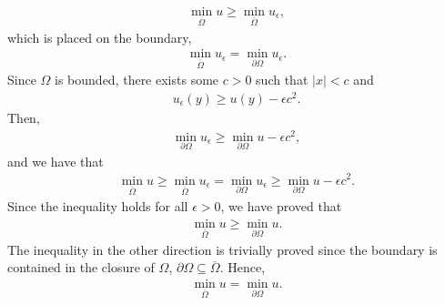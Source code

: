 \begin{questions}
\begin{solution}
\begin{align*}
\min_{\overline{\Omega}}u\geq\min_{\overline{\Omega}}u_{\epsilon},
\end{align*}
which is placed on the boundary,
\begin{align*}
\min_{\overline{\Omega}}u_{\epsilon}=\min_{\partial\Omega}u_{\epsilon}.
\end{align*}
Since $\Omega$ is bounded, there exists some $c>0$ such that $|x|<c$ and
\begin{align*}
u_{\epsilon}(y)\geq u(y)-\epsilon c^2.
\end{align*}
Then,
\begin{align*}
\min_{\partial\Omega}u_{\epsilon}\geq \min_{\partial\Omega}u-\epsilon c^2, 
\end{align*}
and we have that
\begin{align*}
\min_{\overline{\Omega}}u\geq \min_{\overline{\Omega}}u_{\epsilon}=\min_{\partial\Omega}u_{\epsilon}\geq \min_{\partial\Omega}u-\epsilon c^2.
\end{align*}
Since the inequality holds for all $\epsilon>0$, we have proved that
\begin{align*}
\min_{\overline{\Omega}}u\geq \min_{\partial\Omega}u.
\end{align*}
The inequality in the other direction is trivially proved since the boundary is contained in the closure of $\Omega$, $\partial\Omega\subseteq \overline{\Omega}$. Hence,
\begin{align*}
\min_{\overline{\Omega}}u= \min_{\partial\Omega}u.
\end{align*}
\end{solution}
\end{questions}